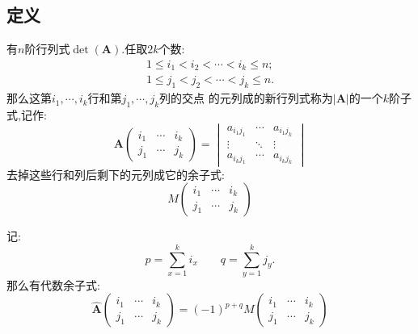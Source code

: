 \subsection{定义}
\begin{formal}
\begin{definition}[$k$阶子式]\label{def:k阶子式}
有$n$阶行列式$ \det\left(\bm{A}\right)$.任取$2k$个数:
\begin{align*}
    1\leqslant i_1 < i_2 <\cdots<i_k\leqslant n;\\
    1\leqslant j_1 < j_2 <\cdots<j_k\leqslant n.
\end{align*}
那么这第$i_1,\cdots,i_k$行和第$j_1,\cdots,j_k$列的交点
的元列成的新行列式称为$\left|\bm{A}\right|$的一个$k$阶子式,记作:
\[
\bm{A}\begin{pmatrix}
    i_1 & \cdots & i_k \\
    j_1 & \cdots & j_k 
\end{pmatrix}=
\begin{vmatrix}
    a_{i_1j_1} & \cdots & a_{i_1j_k} \\
    \vdots & \ddots & \vdots \\
    a_{i_kj_1} & \cdots & a_{i_kj_k}
\end{vmatrix}
\]
去掉这些行和列后剩下的元列成它的余子式:
\[
M\begin{pmatrix}
    i_1 & \cdots & i_k \\
    j_1 & \cdots & j_k
\end{pmatrix}
\]


记:
\[
p = \sum_{x = 1}^k i_x \qquad q= \sum_{y = 1}^k j_y.
\]
那么有代数余子式:
\[
\widehat{\bm{A}} \begin{pmatrix}
    i_1 & \cdots & i_k \\
    j_1 & \cdots & j_k
\end{pmatrix} = \left(- 1\right)^{p + q}
M\begin{pmatrix}
    i_1 & \cdots & i_k \\
    j_1 & \cdots & j_k
\end{pmatrix}
\]
\end{definition}
\end{formal}
